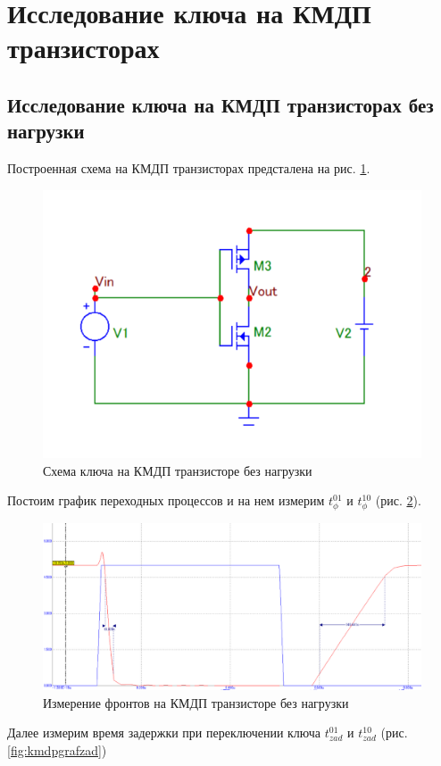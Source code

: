 \documentclass[a4paper,14pt]{article}
\begin{document}
\section{Исследование ключа на КМДП транзисторах}
\subsection{Исследование ключа на КМДП транзисторах без нагрузки}

Построенная схема на КМДП транзисторах предсталена на рис. \ref{fig:kmdpsh}.

\begin{figure}[H]
	\centering
	\includegraphics[width=0.7\linewidth]{image/KMDP_sh}
	\caption{Схема ключа на КМДП транзисторе без нагрузки}
	\label{fig:kmdpsh}
\end{figure}


Постоим график переходных процессов и на нем измерим $t^{01}_{\phi}$ и $t^{10}_{\phi}$ (рис.  \ref{fig:kmdpgraffr}).

\begin{figure}[H]
	\centering
	\includegraphics[width=0.7\linewidth]{image/KMDP_graf_fr}
	\caption{Измерение фронтов на КМДП транзисторе без нагрузки}
	\label{fig:kmdpgraffr}
\end{figure}

Далее измерим время задержки при переключении ключа $t^{01}_{zad}$ и $t^{10}_{zad}$ (рис. \ref{fig:kmdpgrafzad})
\end{document}
